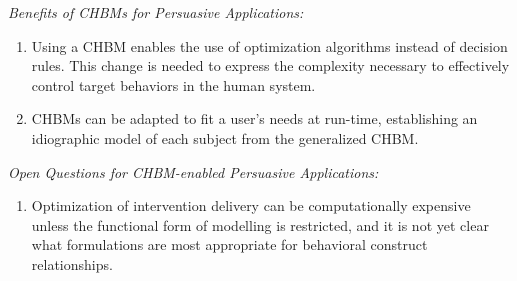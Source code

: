 \documentclass[runningheads,a4paper]{llncs}
\begin{document}
\emph{Benefits of CHBMs for Persuasive Applications:}
\begin{enumerate}
    \item Using a CHBM enables the use of optimization algorithms instead of decision rules. This change is needed to express the complexity necessary to effectively control target behaviors in the human system.
    \item CHBMs can be adapted to fit a user's needs at run-time, establishing an idiographic model of each subject from the generalized CHBM.
\end{enumerate}

\emph{Open Questions for CHBM-enabled Persuasive Applications:}
\begin{enumerate}
    \item Optimization of intervention delivery can be computationally expensive unless the functional form of modelling is restricted, and it is not yet clear what formulations are most appropriate for behavioral construct relationships.
\end{enumerate}
\end{document}
